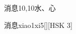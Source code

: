 \begin{entry}{消息}{10,10}{⽔、⼼}
  \begin{phonetics}{消息}{xiao1xi5}[][HSK 3]
  \end{phonetics}
\end{entry}
